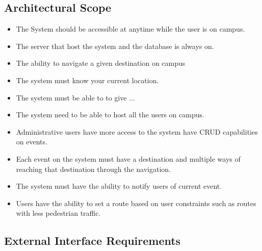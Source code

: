 \documentclass[a4paper,12pt]{report}
\begin{document}
\subsection{Architectural Scope}
\begin{itemize}
	\item The System should be accessible at anytime while the user is on campus.
	\item The server that host the system and the database is always on.
	\item The ability to navigate a given destination on campus
	\item The system must know your current location.
	\item The system must be able to to give ...
	\item The system need to be able to host all the users on campus.
	\item Administrative users have more access to the system have CRUD capabilities on events.
	\item Each event on the system must have a destination and multiple ways of reaching that destination through the navigation.
	\item The system must have the ability to notify users of current event.
	\item Users have the ability to set a route based on user constraints such as routes with less pedestrian traffic. 
\end{itemize}
\newpage
\subsection{External Interface Requirements}
\end{document}
